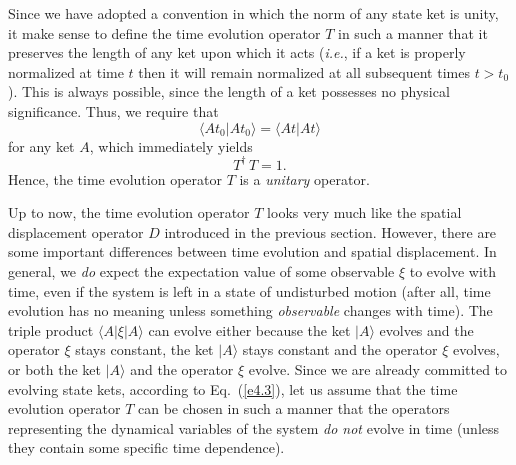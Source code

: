 Since we have adopted a convention in which the norm of any state ket is unity,
it make sense to define the time evolution operator $T$ in such a manner that
it preserves the length of any ket upon which it acts
({\em i.e.}, if a ket is properly normalized at time $t$ then it will remain normalized at
all subsequent times $t>t_0$).
This is always possible,
since the length of a ket possesses no physical significance. Thus,
we require that
\begin{equation} 
\langle A t_0|A t_0\rangle =\langle A t|A t\rangle
\end{equation}
for any ket $A$, 
which immediately yields 
\begin{equation}\label{e4.5}
T^{\dag}\,T = 1.
\end{equation}
Hence, the time evolution operator $T$ is a {\em unitary} operator. 

Up to now, the time evolution operator $T$ looks very much like the 
spatial displacement
operator $D$ introduced in the previous section. However, there are some
important differences between time evolution and spatial displacement. In general,
we {\em do} expect the expectation value of some observable $\xi$ to
evolve with time, even if the system is left in a state of undisturbed motion
(after all, time evolution has no meaning unless something {\em observable}
changes with time). The triple product $\langle A|\xi|A\rangle$ can evolve
either because the ket $|A\rangle$ evolves and the operator $\xi$ stays constant,
the ket $|A\rangle$ stays constant and the operator $\xi$ evolves, or both
the ket $|A\rangle$ and the operator $\xi$ evolve. 
Since we are already committed to evolving state kets, according to Eq.~(\ref{e4.3}),
let us assume that the time evolution operator $T$ can be chosen in such a
manner that the operators representing the dynamical variables of the
system {\em do not}
 evolve in time (unless they contain some specific time dependence). 

